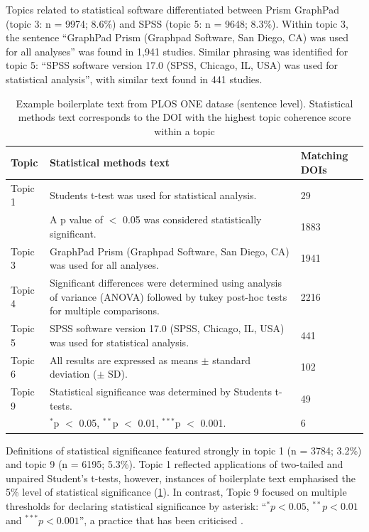 \documentclass[12pt]{article}
\begin{document}
Topics related to statistical software differentiated between Prism
GraphPad (topic 3: n = 9974; 8.6\%) and SPSS (topic 5: n = 9648; 8.3\%).
Within topic 3, the sentence ``GraphPad Prism (Graphpad Software, San
Diego, CA) was used for all analyses'' was found in 1,941 studies.
Similar phrasing was identified for topic 5: ``SPSS software version
17.0 (SPSS, Chicago, IL, USA) was used for statistical analysis'', with
similar text found in 441 studies.

\begin{landscape}
\begin{table}

\caption{\label{tab:plos-example-boilerplate}Example boilerplate text from PLOS ONE datase (sentence level). Statistical methods text corresponds to the DOI with the highest topic coherence score within a topic}
\centering
\begin{tabular}[t]{p{}p{}p{}}
\hline
Topic & Statistical methods text & Matching DOIs\\
\hline
Topic 1 & Students t-test was used for statistical analysis. & 29\\
\cline{2-3}
 & A p value of $<$ 0.05 was considered statistically significant. & 1883\\
\hline
Topic 3 & GraphPad Prism (Graphpad Software, San Diego, CA) was used for all analyses. & 1941\\
\hline
Topic 4 & Significant differences were determined using analysis of variance (ANOVA) followed by tukey post-hoc tests for multiple comparisons. & 2216\\
\hline
Topic 5 & SPSS software version 17.0 (SPSS, Chicago, IL, USA) was used for statistical analysis. & 441\\
\hline
Topic 6 & All results are expressed as means $\pm$ standard deviation ($\pm$ SD). & 102\\
\hline
Topic 9 & Statistical significance was determined by Students t-tests. & 49\\
\cline{2-3}
& $^*$p $<$ 0.05, $^{**}$p $<$ 0.01, $^{***}$p $<$ 0.001. & 6\\
\hline
\end{tabular}
\end{table}
\end{landscape}


Definitions of statistical significance featured strongly in topic 1 (n
= 3784; 3.2\%) and topic 9 (n = 6195; 5.3\%). Topic 1 reflected
applications of two-tailed and unpaired Student's t-tests, however,
instances of boilerplate text emphasised the 5\% level of statistical
significance (\ref{tab:plos-example-boilerplate}). In contrast, Topic 9
focused on multiple thresholds for declaring statistical significance by
asterisk: ``\(^{*}p<0.05\), \(^{**}p<0.01\) and \(^{***}p<0.001\)'', a
practice that has been criticised \citep{Wasserstein2019}.
\end{document}
